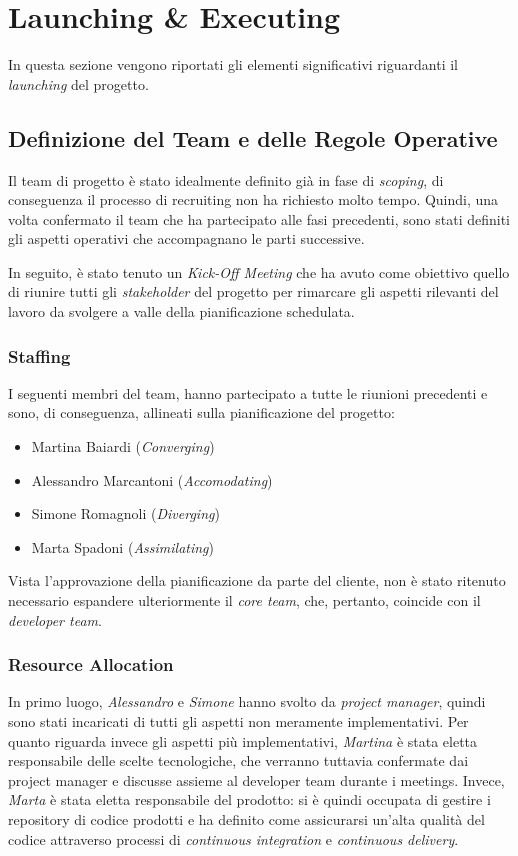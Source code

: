 \section{Launching \& Executing}
\label{sec:launching}

In questa sezione vengono riportati gli elementi significativi riguardanti il \textit{launching} del progetto.

\subsection{Definizione del Team e delle Regole Operative}

Il team di progetto è stato idealmente definito già in fase di \textit{scoping}, di conseguenza il processo di recruiting non ha richiesto molto tempo. Quindi, una volta confermato il team che ha partecipato alle fasi precedenti, sono stati definiti gli aspetti operativi che accompagnano le parti successive.

In seguito, è stato tenuto un \textit{Kick-Off Meeting} che ha avuto come obiettivo quello di riunire tutti gli \textit{stakeholder} del progetto per rimarcare gli aspetti rilevanti del lavoro da svolgere a valle della pianificazione schedulata.

\subsubsection{Staffing}
I seguenti membri del team, hanno partecipato a tutte le riunioni precedenti e sono, di conseguenza, allineati sulla pianificazione del progetto:
\begin{itemize}
    \item Martina Baiardi (\textit{Converging})
    \item Alessandro Marcantoni (\textit{Accomodating})
    \item Simone Romagnoli (\textit{Diverging})
    \item Marta Spadoni (\textit{Assimilating})
\end{itemize}
Vista l'approvazione della pianificazione da parte del cliente, non è stato ritenuto necessario espandere ulteriormente il \textit{core team}, che, pertanto, coincide con il \textit{developer team}.

\subsubsection{Resource Allocation}
In primo luogo, \textit{Alessandro} e \textit{Simone} hanno svolto da \textit{project manager}, quindi sono stati incaricati di tutti gli aspetti non meramente implementativi.
Per quanto riguarda invece gli aspetti più implementativi, \textit{Martina} è stata eletta responsabile delle scelte tecnologiche, che verranno tuttavia confermate dai project manager e discusse assieme al developer team durante i meetings. Invece, \textit{Marta} è stata eletta responsabile del prodotto: si è quindi occupata di gestire i repository di codice prodotti e ha definito come assicurarsi un'alta qualità del codice attraverso processi di \textit{continuous integration} e \textit{continuous delivery}.

